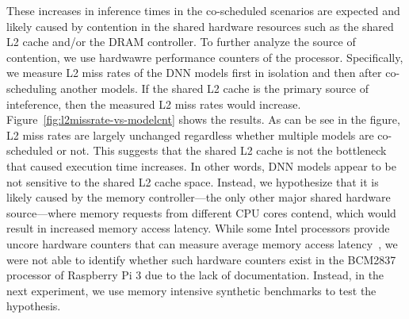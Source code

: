 These increases in inference times in the co-scheduled scenarios are
expected and likely caused by contention in the shared hardware
resources such as the shared L2 cache and/or the DRAM controller.
To further analyze the source of contention, we use hardwawre
performance counters of the processor. Specifically, we measure L2
miss rates of the DNN models first in isolation and then after
co-scheduling another models. If the shared L2 cache is the primary
source of inteference, then the measured L2 miss rates would
increase. Figure~\ref{fig:l2missrate-vs-modelcnt} shows the results.
As can be see in the figure, L2 miss rates are largely unchanged
regardless whether multiple models are co-scheduled or not. This
suggests that the shared L2 cache is not the bottleneck that caused
execution time increases. In other words, DNN models appear to be not
sensitive to the shared L2 cache space. %
Instead, we hypothesize that it is likely caused by the memory
controller---the only other major shared hardware source---where
memory requests from different CPU cores contend, which would result
in increased memory access latency. While some Intel processors
provide uncore hardware counters that can measure average memory
access latency~\cite{ye2016maracas}, we were not able to identify
whether such hardware counters exist in the BCM2837 processor of
Raspberry Pi 3 due to the lack of documentation. Instead, in the next
experiment, we use memory intensive synthetic benchmarks to test the
hypothesis.



